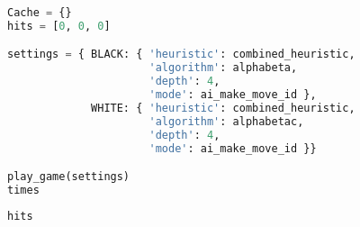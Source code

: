 \begin{lstlisting}[language=Python]
Cache = {}
hits = [0, 0, 0]

settings = { BLACK: { 'heuristic': combined_heuristic,
                      'algorithm': alphabeta,
                      'depth': 4,
                      'mode': ai_make_move_id },
             WHITE: { 'heuristic': combined_heuristic,
                      'algorithm': alphabetac,
                      'depth': 4,
                      'mode': ai_make_move_id }}

play_game(settings)
times
\end{lstlisting}

\begin{lstlisting}[language=Python]
hits
\end{lstlisting}
